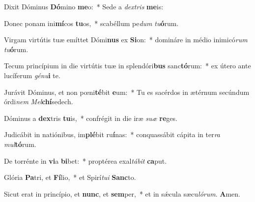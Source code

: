 \item Dixit Dóminus \textbf{Dó}mino \textbf{me}o:~* Sede a \textit{dex}\textit{tris} \textbf{me}is:

\item Donec ponam ini\textbf{mí}cos \textbf{tu}os,~* scabéllum pe\textit{dum} \textit{tu}\textbf{ó}rum.

\item Virgam virtútis tuæ emíttet Dómi\textbf{nus} ex \textbf{Si}on:~* domináre in médio inimicó\textit{rum} \textit{tu}\textbf{ó}rum.

\item Tecum princípium in die virtútis tuæ in splendóri\textbf{bus} sanc\textbf{tó}rum:~* ex útero ante lucíferum \textit{gé}\textit{nu}\textbf{i} te.

\item Jurávit Dóminus, et non pœni\textbf{té}bit \textbf{e}um:~* Tu es sacérdos in ætérnum secúndum órdi\textit{nem} \textit{Mel}\textbf{chí}sedech.

\item Dóminus a \textbf{dex}tris \textbf{tu}is,~* confrégit in die iræ \textit{su}\textit{æ} \textbf{re}ges.

\item Judicábit in natiónibus, im\textbf{plé}bit ru\textbf{í}nas:~* conquassábit cápita in ter\textit{ra} \textit{mul}\textbf{tó}rum.

\item De torrénte in \textbf{vi}a \textbf{bi}bet:~* proptérea exal\textit{tá}\textit{bit} \textbf{ca}put.

\item Glória \textbf{Pa}tri, et \textbf{Fí}lio,~* et Spirí\textit{tu}\textit{i} \textbf{Sanc}to.

\item Sicut erat in princípio, et \textbf{nunc}, et \textbf{sem}per,~* et in sǽcula sæcu\textit{ló}\textit{rum}. \textbf{A}men.

